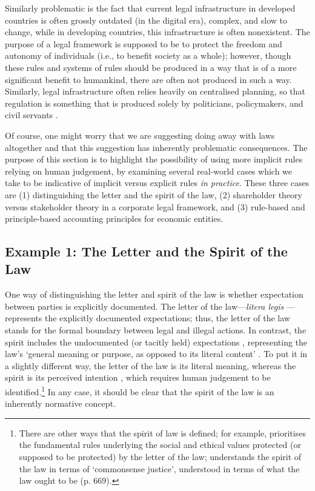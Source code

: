 \documentclass{amsart}
\theoremstyle{indented}
\theoremstyle{indentedProp}
\theoremstyle{indented}
\theoremstyle{indented}
\theoremstyle{indented}
\theoremstyle{indented}
\theoremstyle{indented}
\begin{document}
Similarly problematic is the fact that current legal infrastructure in developed countries is often grossly outdated (in the digital era), complex, and slow to change, while in developing countries, this infrastructure is often nonexistent. The purpose of a legal framework is supposed to be to protect the freedom and autonomy of individuals (i.e., to benefit society as a whole); however, though these rules and systems of rules should be produced in a way that is of a more significant benefit to humankind, there are often not produced in such a way. Similarly, legal infrastructure often relies heavily on centralised planning, so that regulation is something that is produced solely by politicians, policymakers, and civil servants \citep[p. 246]{Hadfield-2019}.

Of course, one might worry that we are suggesting doing away with laws altogether and that this suggestion has inherently problematic consequences. The purpose of this section is to highlight the possibility of using more implicit rules relying on human judgement, by examining several real-world cases which we take to be indicative of implicit versus explicit rules {\it in practice}. These three cases are (1) distinguishing the letter and the spirit of the law, (2) shareholder theory versus stakeholder theory in a corporate legal framework, and (3) rule-based and principle-based accounting principles for economic entities. 


\subsection{Example 1: The Letter and the Spirit of the Law}
\label{sec:Example1}

One way of distinguishing the letter and spirit of the law is whether expectation between parties is explicitly documented. The letter of the law---{\it litera legis} \citep{Garner-2009}---represents the explicitly documented expectations; thus, the letter of the law stands for the formal boundary between legal and illegal actions. In contrast, the spirit includes the undocumented (or tacitly held) expectations \citep{Harmon-et-al-2014}, representing the law's `general meaning or purpose, as opposed to its literal content' \citep{Garner-2009}. To put it in a slightly different way, the letter of the law is its literal meaning, whereas the spirit is its perceived intention \citep{Garcia-et-al-2014}, which requires human judgement to be identified.\footnote{There are other ways that the spirit of law is defined; for example, \citet{Ostas-2004} prioritises the fundamental rules underlying the social and ethical values protected (or supposed to be protected) by the letter of the law; \citet{Finkel-1995, Finkel-1999} understands the spirit of the law in terms of `commonsense justice', understood in terms of what the law ought to be (p. 669).} In any case, it should be clear that the spirit of the law is an inherently normative concept.
\end{document}
